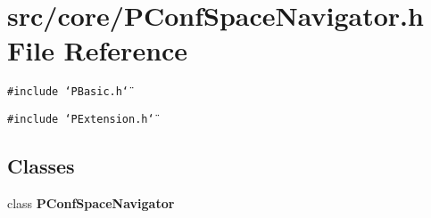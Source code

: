 \section{src/core/PConf\-Space\-Navigator.h File Reference}
\label{PConfSpaceNavigator_8h}


{\tt \#include \char`\"{}PBasic.h\char`\"{}}\par
{\tt \#include \char`\"{}PExtension.h\char`\"{}}\par
\subsection*{Classes}
\begin{CompactItemize}
\item 
class {\bf PConf\-Space\-Navigator}
\end{CompactItemize}
